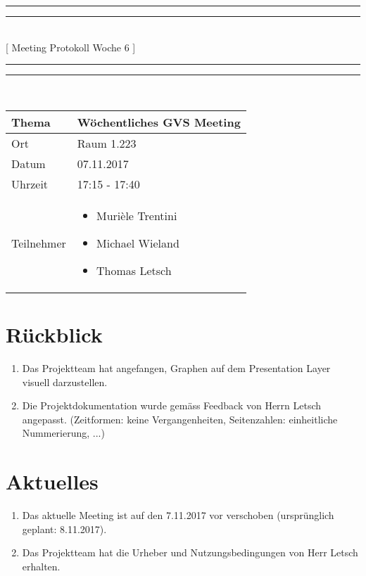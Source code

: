 \documentclass[11pt, a4paper,oneside]{scrartcl}
\begin{document}
\centering
\rule{\textwidth}{1.6pt}\vspace*{-\baselineskip}\vspace*{2pt} %
\rule{\textwidth}{0.4pt}\\[\baselineskip] %
{\LARGE [ Meeting Protokoll Woche 6 ]}\\[0.2\baselineskip] %
\rule{\textwidth}{0.4pt}\vspace*{-\baselineskip}\vspace{3.2pt} %
\rule{\textwidth}{1.6pt}\\[2\baselineskip] %

\begin{tabu} to \linewidth {l X }
	\toprule
	\textbf{Thema} & \textbf{Wöchentliches GVS Meeting} \\
	\midrule
	Ort & Raum 1.223 \\
	Datum & 07.11.2017  \\
	Uhrzeit &  17:15 - 17:40  \\
	Teilnehmer & 
	\begin{minipage}[t]{\textwidth}
	  	\begin{itemize}
			\item Murièle Trentini
			\item Michael Wieland
			\item Thomas Letsch
	  	\end{itemize}
	\end{minipage}
	\\
	\bottomrule
\end{tabu}


\section{Rückblick}
\begin{enumerate}
	\item Das Projektteam hat angefangen, Graphen auf dem Presentation Layer visuell darzustellen. 
	\item Die Projektdokumentation wurde gemäss Feedback von Herrn Letsch angepasst. (Zeitformen: keine Vergangenheiten, Seitenzahlen: einheitliche Nummerierung, ...)
\end{enumerate}

\section{Aktuelles}
\begin{enumerate}
	\item Das aktuelle Meeting ist auf den 7.11.2017 vor verschoben (ursprünglich geplant: 8.11.2017).
	\item Das Projektteam hat die Urheber und Nutzungsbedingungen von Herr Letsch erhalten.
\end{enumerate}
\end{document}
